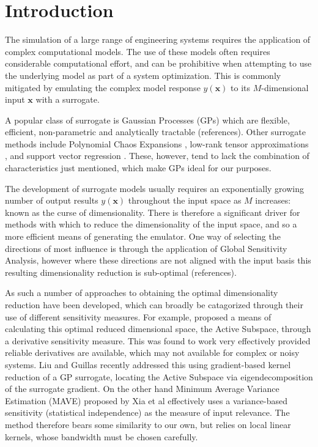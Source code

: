 \documentclass[preprint,12pt]{elsarticle}
\newcommand*{\M}[1]{\ensuremath{#1}\xspace}
\newcommand*{\vr}[1]{\M{\mathbf{#1}}}
\begin{document}

    \section{Introduction} \label{sec:Intro}
        The simulation of a large range of engineering systems requires the application of complex computational models. The use of these models often requires considerable computational effort, and can be prohibitive when attempting to use the underlying model as part of a system optimization. This is commonly mitigated by emulating the complex model response $y(\vr{x})$ to its \M{M}-dimensional input $\vr{x}$ with a surrogate. 
        
        A popular class of surrogate is Gaussian Processes (GPs) \cite{Sacks.etal1989, Rasmussen.Williams2005} which are flexible, efficient, non-parametric and analytically tractable (references). Other surrogate methods include Polynomial Chaos Expansions \cite{Ghanem.Spanos1997,Xiu.Karniadakis2002,Xiu2010}, low-rank tensor approximations \cite{Chevreuil.etal2015,Konakli.Sudret2016}, and support vector regression \cite{Cortes.Vapnik1995}.
        These, however, tend to lack the combination of characteristics just mentioned, which make GPs ideal for our purposes.
        
        The development of surrogate models usually requires an exponentially growing number of output results $y(\vr{x})$ throughout the input space as \M{M} increases: known as the curse of dimensionality. There is therefore a significant driver for methods with which to reduce the dimensionality of the input space, and so a more efficient means of generating the emulator. One way of selecting the directions of most influence is through the application of Global Sensitivity Analysis, however where these directions are not aligned with the input basis this resulting dimensionality reduction is sub-optimal (references).
        
        As such a number of approaches to obtaining the optimal dimensionality reduction have been developed, which can broadly be catagorized through their use of different sensitivity measures. For example, \cite{Constantine.etal2014} proposed a means of calculating this optimal reduced dimensional space, the Active Subspace, through a derivative sensitivity measure. This was found to work very effectively provided reliable derivatives are available, which may not available for complex or noisy systems. Liu and Guillas \cite{Liu.Guillas2017} recently addressed this using gradient-based kernel reduction of a GP surrogate, locating the Active Subspace via eigendecomposition of the surrogate gradient.
        On the other hand Minimum Average Variance Estimation (MAVE) proposed by Xia et al \cite{Xia.etal2002} effectively uses a variance-based sensitivity (statistical independence) as the measure of input relevance. The method therefore bears some similarity to our own, but relies on local linear kernels, whose bandwidth must be chosen carefully.
         
\end{document}
